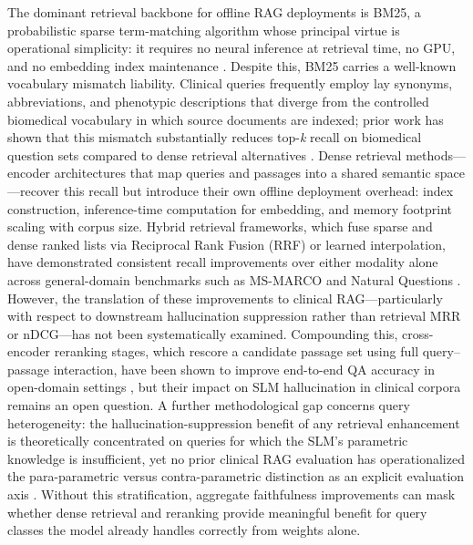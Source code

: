 \documentclass{article}
\begin{document}
The dominant retrieval backbone for offline RAG deployments is BM25, a probabilistic sparse term-matching algorithm whose principal virtue is operational simplicity: it requires no neural inference at retrieval time, no GPU, and no embedding index maintenance \cite{robertson2009probabilistic}. Despite this, BM25 carries a well-known vocabulary mismatch liability. Clinical queries frequently employ lay synonyms, abbreviations, and phenotypic descriptions that diverge from the controlled biomedical vocabulary in which source documents are indexed; prior work has shown that this mismatch substantially reduces top-\textit{k} recall on biomedical question sets compared to dense retrieval alternatives \cite{karpukhin2020dense}. Dense retrieval methods---encoder architectures that map queries and passages into a shared semantic space---recover this recall but introduce their own offline deployment overhead: index construction, inference-time computation for embedding, and memory footprint scaling with corpus size. Hybrid retrieval frameworks, which fuse sparse and dense ranked lists via Reciprocal Rank Fusion (RRF) or learned interpolation, have demonstrated consistent recall improvements over either modality alone across general-domain benchmarks such as MS-MARCO and Natural Questions \cite{cormack2009reciprocal,thakur2021beir}. However, the translation of these improvements to clinical RAG---particularly with respect to downstream hallucination suppression rather than retrieval MRR or nDCG---has not been systematically examined. Compounding this, cross-encoder reranking stages, which rescore a candidate passage set using full query--passage interaction, have been shown to improve end-to-end QA accuracy in open-domain settings \cite{nogueira2019passage}, but their impact on SLM hallucination in clinical corpora remains an open question. A further methodological gap concerns query heterogeneity: the hallucination-suppression benefit of any retrieval enhancement is theoretically concentrated on queries for which the SLM's parametric knowledge is insufficient, yet no prior clinical RAG evaluation has operationalized the para-parametric versus contra-parametric distinction as an explicit evaluation axis \cite{singhal2023large}. Without this stratification, aggregate faithfulness improvements can mask whether dense retrieval and reranking provide meaningful benefit for query classes the model already handles correctly from weights alone.
\end{document}
